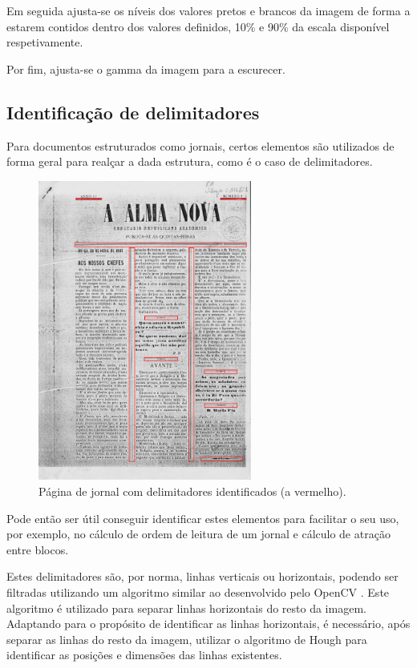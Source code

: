 Em seguida ajusta-se os níveis dos valores pretos e brancos da imagem de forma a estarem contidos dentro dos valores definidos, 10\% e 90\% da escala disponível respetivamente. 

Por fim, ajusta-se o gamma da imagem para a escurecer.


\subsection{Identificação de delimitadores}
\label{contribution_image_delimiter_identification}

Para documentos estruturados como jornais, certos elementos são utilizados de forma geral para realçar a dada estrutura, como é o caso de delimitadores.


\begin{figure}[H]
	\centering
	\includegraphics[width=7cm]{images/ilustracoes/document_delimiters.png}
	\caption{Página de jornal com delimitadores identificados (a vermelho).}
	\label{fig:document_delimiters_example}
\end{figure}

Pode então ser útil conseguir identificar estes elementos para facilitar o seu uso, por exemplo, no cálculo de ordem de leitura de um jornal e cálculo de atração entre blocos.

Estes delimitadores são, por norma, linhas verticais ou horizontais, podendo ser filtradas utilizando um algoritmo similar ao desenvolvido pelo OpenCV \citep{cv_extract_lines}. Este algoritmo é utilizado para separar linhas horizontais do resto da imagem. Adaptando para o propósito de identificar as linhas horizontais, é necessário, após separar as linhas do resto da imagem, utilizar o algoritmo de Hough para identificar as posições e dimensões das linhas existentes.

